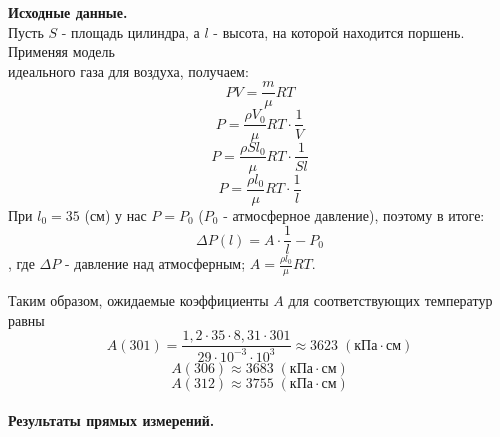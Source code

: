 \documentclass[a4paper]{article}
\begin{document}
	{\parindent=0pt\textbf{Исходные данные.}}\\
	Пусть $S$ - площадь цилиндра, а $l$ - высота, на которой находится поршень. Применяя модель\\ идеального газа для воздуха, получаем:
	$$ PV=\frac{m}{\mu} RT$$
	$$ P=\frac{\rho V_0}{\mu}RT\cdot\frac{1}{V}$$
	$$ P=\frac{\rho S l_0}{\mu}RT\cdot\frac{1}{S l}$$
	$$ P=\frac{\rho  l_0}{\mu}RT\cdot\frac{1}{ l}$$
	При $l_0=35$ (см) у нас $P=P_0$ ($P_0$ - атмосферное давление), поэтому в итоге:
	$$\Delta P(l)=A\cdot \frac{1}{l} - P_0$$
	, где $\Delta P$ - давление над атмосферным; $A = \frac{\rho  l_0}{\mu}RT$.\\
	\parindent=0pt
	
	Таким образом, ожидаемые коэффициенты $A$ для соответствующих температур  равны
	$$ A(301)=\frac{1,2\cdot35\cdot8,31\cdot301}{29\cdot10^{-3}\cdot10^3}\approx3623\;\left( \mbox{кПа}\cdot\mbox{см}\right) $$
	$$ A(306)\approx3683\;\left( \mbox{кПа}\cdot\mbox{см}\right) $$
	$$ A(312)\approx3755\;\left( \mbox{кПа}\cdot\mbox{см}\right) $$\\
	
		\newpage
	{\parindent=0pt\textbf{Результаты прямых измерений.}}\\
	
\end{document}
